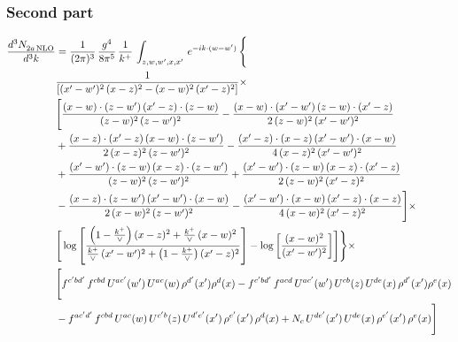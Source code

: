 \documentclass[9pt]{article}
\numberwithin{equation}{section}
\begin{document}
\subsubsection{Second part}
\begin{align}
    \frac{d^{3}N_{2a\,\rm NLO}^{\rm}}{d^{3}k}  & =  \frac{1}{(2\pi)^{3}}\, \frac{g^{4}}{8\pi^{5}}\,\frac{1}{k^{+}}\,\int_{z,w,w^{\prime},x,x'}\, e^{-ik\cdot (w-w')}\, \Bigg\{\notag \\
& \frac{1}{\left[(x'-w')^{2}\, (x-z)^{2}-(x-w)^{2}\, (x'-z)^{2}\right]}\times\,\notag \\ & \Bigg[\frac{(x-w)\cdot (z-w')\, (x'-z)\cdot (z-w)}{(z-w)^{2}\,(z-w')^{2}}-\frac{(x-w)\cdot (x'-w')\, (z-w)\cdot (x'-z)}{2\, (z-w)^{2}\, (x'-w')^{2}}\notag \\ & + \frac{(x-z)\cdot (x'-z)\, (x-w)\cdot (z-w')}{2\, (x-z)^{2}\, (z-w')^{2}}-\frac{(x'-z)\cdot (x-z)\, (x'-w')\cdot (x-w)}{4\, (x-z)^{2}\, (x'-w')^{2}}\notag \\ & + \frac{(x'-w')\cdot (z-w)\, (x-z)\cdot (z-w')}{(z-w)^{2}\,(z-w')^{2}}+\frac{(x'-w')\cdot (z-w)\, (x-z)\cdot (x'-z)}{2\, (z-w)^{2}\, (x'-z)^{2}}\notag \\ & - \frac{(x-z)\cdot (z-w')\, (x'-w')\cdot (x-w)}{2\, (x-w)^{2}\, (z-w')^{2}} -\frac{(x'-w')\cdot (x-w)\, (x'-z)\cdot (x-z)}{4\, (x-w)^{2}\, (x'-z)^{2}}\Bigg]\times\notag \\ &  \Bigg[\log{\left[\frac{\left(1-\frac{k^{+}}{\vee}\right)(x-z)^{2}+\frac{k^{+}}{\vee}\,(x-w)^{2}}{\frac{k^{+}}{\vee}\, (x'-w')^{2} + \left(1-\frac{k^{+}}{\vee}\right) (x'-z)^{2}}\right]}-\log{\left[\frac{(x-w)^{2}}{(x'-w')^{2}}\right]}\Bigg]\Bigg\} \times\, \notag \\ & \Bigg[f^{c'bd'}\,f^{cbd}\, U^{ac'}(w')\,U^{ac}(w)\,\rho^{d'}(x')\rho^{d}(x)- f^{c'bd'}\,f^{acd}\,U^{ac'}(w')\,U^{cb}(z)\,U^{de}(x)\,\rho^{d'}(x')\rho^{e}(x) \notag \\ & -f^{ac'd'}\,f^{cbd}\,U^{ac}(w)\,U^{c'b}(z)\,U^{d'e'}(x')\,\rho^{e'}(x')\,\rho^{d}(x) +N_{c}\,U^{de'}(x')\,U^{de}(x)\,\rho^{e'}(x')\,\rho^{e}(x)\Bigg]
\end{align}
\end{document}
